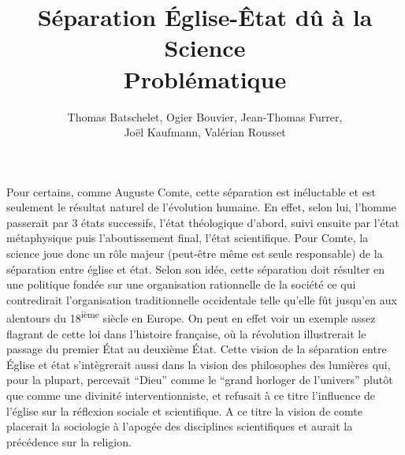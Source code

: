 \documentclass{article}
\title{Séparation Église-Êtat dû à la Science \\
  \large{Problématique}}
\author{Thomas Batschelet, Ogier Bouvier, Jean-Thomas Furrer, \\ Joël Kaufmann, Valérian Rousset}
\begin{document}
\maketitle

Pour certains, comme Auguste Comte, cette séparation est inéluctable
et est seulement le résultat naturel de l'évolution humaine. En effet,
selon lui, l'homme passerait par 3 états successifs, l'état
théologique d'abord, suivi ensuite par l'état métaphysique puis
l'aboutissement final, l'état scientifique. Pour Comte, la science
joue donc un rôle majeur (peut-être même est seule responsable) de la
séparation entre église et état. Selon son idée, cette séparation doit
résulter en une politique fondée sur une organisation rationnelle de
la société ce qui contredirait l'organisation traditionnelle
occidentale telle qu'elle fût jusqu'en aux alentours du
18\textsuperscript{ième} siècle en Europe. On peut en effet voir un
exemple assez flagrant de cette loi dans l'histoire française, où la
révolution illustrerait le passage du premier État au deuxième
État. Cette vision de la séparation entre Église et état s'intègrerait
aussi dans la vision des philosophes des lumières qui, pour la
plupart, percevait ``Dieu'' comme le ``grand horloger de l'univers''
plutôt que comme une divinité interventionniste, et refusait à ce titre
l'influence de l'église sur la réflexion sociale et scientifique.
A ce titre la vision de comte placerait la sociologie à l'apogée des
disciplines scientifiques et aurait la précédence sur la religion.
\end{document}
